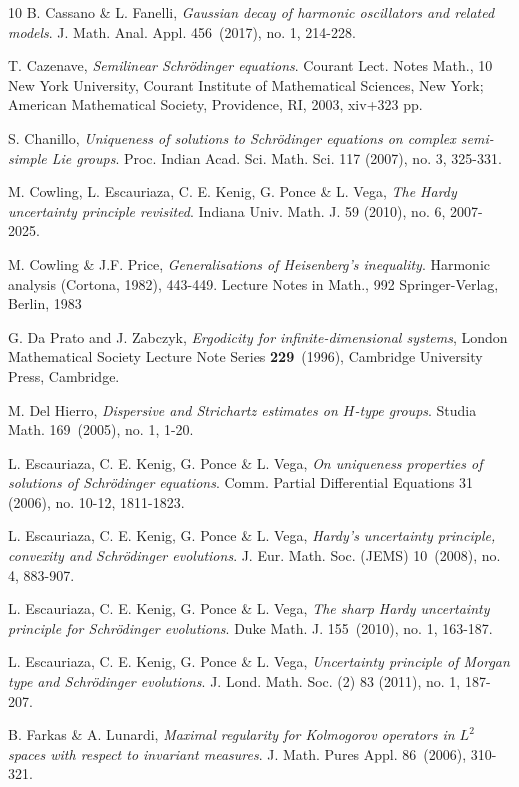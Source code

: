 \documentclass[11pt,a4paper]{amsart}
\numberwithin{equation}{section}
\numberwithin{equation}{section}
\begin{document}
\begin{thebibliography}{10}
B. Cassano \& L. Fanelli, \emph{Gaussian decay of harmonic oscillators and related models}.
J. Math. Anal. Appl. 456~(2017), no. 1, 214-228.


 T. Cazenave, \emph{Semilinear Schr\"odinger equations}. Courant Lect. Notes Math., 10
New York University, Courant Institute of Mathematical Sciences, New York; American Mathematical Society, Providence, RI, 2003, xiv+323 pp.

S. Chanillo, \emph{Uniqueness of solutions to Schr\"odinger equations on complex semi-simple Lie groups}.
Proc. Indian Acad. Sci. Math. Sci. 117 (2007), no. 3, 325-331.

M. Cowling, L. Escauriaza, C. E. Kenig, G. Ponce \& L. Vega, \emph{The Hardy uncertainty principle revisited}.
Indiana Univ. Math. J. 59 (2010), no. 6, 2007-2025.

M. Cowling \& J.F. Price, \emph{Generalisations of Heisenberg's inequality}. Harmonic analysis (Cortona, 1982), 443-449.
Lecture Notes in Math., 992
Springer-Verlag, Berlin, 1983

G. Da Prato and J. Zabczyk, \emph{Ergodicity for infinite-dimensional systems}, London Mathematical Society Lecture Note Series \textbf{229}~(1996), Cambridge University Press, Cambridge.

M. Del Hierro, \emph{Dispersive and Strichartz estimates on $H$-type groups}.
Studia Math. 169~(2005), no. 1, 1-20.

L. Escauriaza, C. E. Kenig, G. Ponce \& L. Vega, \emph{On uniqueness properties of solutions of Schr\"odinger equations}.
Comm. Partial Differential Equations 31 (2006), no. 10-12, 1811-1823.


L. Escauriaza, C. E. Kenig, G. Ponce \& L. Vega, \emph{Hardy's uncertainty principle, convexity and Schr\"odinger evolutions}.
J. Eur. Math. Soc. (JEMS) 10~(2008), no. 4, 883-907.

L. Escauriaza, C. E. Kenig, G. Ponce \& L. Vega, \emph{The sharp Hardy uncertainty principle for Schr\"odinger evolutions}.
Duke Math. J. 155~(2010), no. 1, 163-187.

L. Escauriaza, C. E. Kenig, G. Ponce \& L. Vega, \emph{ Uncertainty principle of Morgan type and Schr\"odinger evolutions}.
J. Lond. Math. Soc. (2) 83 (2011), no. 1, 187-207.

B. Farkas \& A. Lunardi, \emph{Maximal regularity for Kolmogorov operators in $L^2$ spaces with respect to invariant measures}. J. Math. Pures Appl. 86~(2006), 310-321.


\end{thebibliography}
\end{document}
